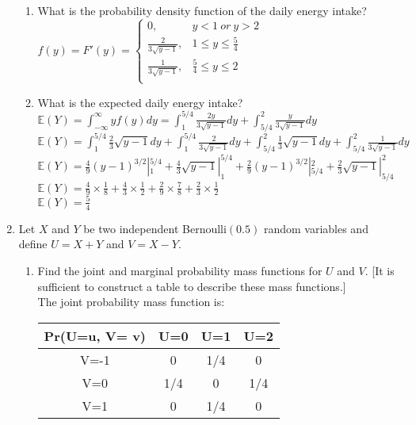 \documentclass[11pt]{article}
\begin{document}
\begin{enumerate}[label=\textbf{Question \arabic*:},start=1]
\begin{enumerate}
	\item What is the probability density function of the daily energy intake?\\
	
	$f(y) = F'(y) = \begin{cases}
		0, & y < 1\ or\ y > 2\\
		\frac{2}{3 \sqrt{y-1}}, & 1 \leq y \le \frac{5}{4} \\
		\frac{1}{ 3\sqrt{y-1}}, & \frac{5}{4} \le y \leq 2\\
		\end{cases}$\\

	\item What is the expected daily energy intake?\\
	
	$\mathbb{E}(Y) = \int_{-\infty}^{\infty} y f(y) dy = \int_{1}^{5/4} \frac{2y}{3\sqrt{y-1}} dy+ \int_{5/4}^{2} \frac{y}{3\sqrt{y-1}} dy$\\
	$\mathbb{E}(Y) = \int_{1}^{5/4} \frac{2}{3} \sqrt{y-1}dy + \int_{1}^{5/4} \frac{2}{3\sqrt{y-1}}dy + \int_{5/4}^{2} \frac{1}{3} \sqrt{y-1}dy + \int_{5/4}^{2} \frac{1}{3\sqrt{y-1}} dy$ \\
	$\mathbb{E}(Y) = \frac{4}{9} (y-1)^{3/2} |_{1}^{5/4} + \frac{4}{3} \sqrt{y-1} |_{1}^{5/4} + \frac{2}{9} (y-1)^{3/2} |_{5/4}^{2} + \frac{2}{3} \sqrt{y-1} |_{5/4}^{2} $ \\
	$\mathbb{E}(Y) = \frac{4}{9} \times \frac{1}{8} + \frac{4}{3} \times \frac{1}{2} + \frac{2}{9} \times \frac{7}{8}  + \frac{2}{3} \times \frac{1}{2}$ \\
	
	$\mathbb{E}(Y) = \frac{5}{4}$
	
\end{enumerate}





\item Let $X$ and $Y$ be two independent Bernoulli$(0.5)$ random variables and define $U = X + Y$ and $V = X - Y$. 
\begin{enumerate}
	\item Find the joint and marginal probability mass functions for $U$ and $V$. [It is sufficient to construct a table to describe these mass functions.]\\
	
	The joint probability mass function is:
\begin{center}
 \begin{tabular}{|| c c c c ||} 
 \hline
 Pr(U=u, V= v) & U=0 & U=1 & U=2 \\ [0.5ex] 
 \hline\hline
 V=-1 & 0 & 1/4 & 0  \\ 
 \hline
 V=0 & 1/4 & 0 & 1/4  \\
 \hline
 V=1 & 0 & 1/4 & 0 \\
 \hline
\end{tabular}
\end{center}


\end{enumerate}
\end{enumerate}
\end{document}

